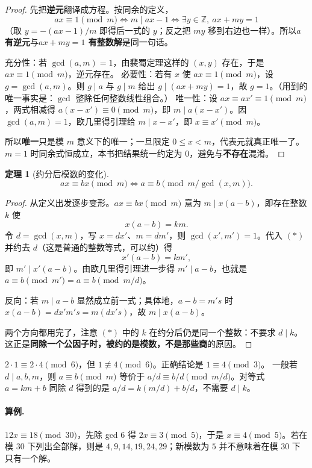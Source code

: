 \documentclass[UTF8,a4paper,11pt,twoside,openright,fontset=fandol]{ctexbook}
\theoremstyle{definition}
\newtheorem{theorem}[definition]{定理}
\newcommand{\Z}{\mathbb Z}
\begin{document}
\begin{proof}
先把\textbf{逆元}翻译成方程。按同余的定义，
\[
 ax\equiv1\pmod m\iff m\mid ax-1\iff \exists y\in\Z,\ ax+my=1
\]
（取 $y=-(ax-1)/m$ 即得后一式的 $y$；反之把 $my$ 移到右边也一样）。所以\textbf{$a$ 有逆元}与\textbf{$ax+my=1$ 有整数解}是同一句话。

充分性：若 $\gcd(a,m)=1$，由裴蜀定理这样的 $(x,y)$ 存在，于是 $ax\equiv1\pmod m$，逆元存在。
必要性：若有 $x$ 使 $ax\equiv1\pmod m$，设 $g=\gcd(a,m)$。则 $g\mid a$ 与 $g\mid m$ 给出 $g\mid(ax+my)=1$，故 $g=1$。（用到的唯一事实是：$\gcd$ 整除任何整数线性组合。）
唯一性：设 $ax\equiv ax'\equiv1\pmod m$，两式相减得 $a(x-x')\equiv0\pmod m$，即 $m\mid a(x-x')$。因 $\gcd(a,m)=1$，欧几里得引理给 $m\mid x-x'$，即 $x\equiv x'\pmod m$。

所以\textbf{唯一}只是模 $m$ 意义下的唯一；一旦限定 $0\le x<m$，代表元就真正唯一了。$m=1$ 时同余式恒成立，本书把结果统一约定为 $0$，避免与\textbf{不存在}混淆。
\end{proof}
\begin{theorem}[约分后模数的变化]
\[
 ax\equiv bx\pmod m
 \iff a\equiv b\pmod{m/\gcd(x,m)}.
\]
\end{theorem}
\begin{proof}
从定义出发逐步变形。$ax\equiv bx\pmod m$ 意为 $m\mid x(a-b)$，即存在整数 $k$ 使
\[
 x(a-b)=km. \tag{$\ast$}
\]
令 $d=\gcd(x,m)$，写 $x=dx'$、$m=dm'$，则 $\gcd(x',m')=1$。代入 $(\ast)$ 并约去 $d$（这是普通的整数等式，可以约）得
\[
 x'(a-b)=km',
\]
即 $m'\mid x'(a-b)$。由欧几里得引理进一步得 $m'\mid a-b$，也就是 $a\equiv b\pmod{m'}=a\equiv b\pmod{m/d}$。

反向：若 $m\mid a-b$ 显然成立前一式；具体地，$a-b=m's$ 时 $x(a-b)=dx'm's=m(dx's)$，故 $m\mid x(a-b)$。

两个方向都用完了，注意 $(\ast)$ 中的 $k$ 在约分后仍是同一个整数：不要求 $d\mid k$。这正是\textbf{同除一个公因子时，被约的是模数，不是那些商}的原因。
\end{proof}

\begin{pitfall}[把整数除法直接搬到同余式中会出错]
$2\cdot1\equiv2\cdot4\pmod6$，但 $1\not\equiv4\pmod6$。正确结论是 $1\equiv4\pmod3$。
一般若 $d\mid a,b,m$，则 $a\equiv b\pmod m$ 等价于 $a/d\equiv b/d\pmod{m/d}$。对等式 $a=km+b$ 同除 $d$ 得到的是 $a/d=k(m/d)+b/d$，不需要 $d\mid k$。
\end{pitfall}
\paragraph{算例.} $12x\equiv18\pmod{30}$，先除 gcd $6$ 得 $2x\equiv3\pmod5$，于是 $x\equiv4\pmod5$。若在模 $30$ 下列出全部解，则是 $4,9,14,19,24,29$；新模数为 $5$ 并不意味着在模 $30$ 下只有一个解。
\end{document}
